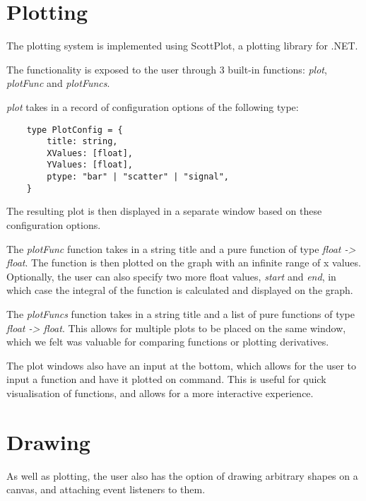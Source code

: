 \section{Plotting}\label{sec:plotting}

The plotting system is implemented using ScottPlot\citep{scottPlot}, a plotting library for .NET\@.

The functionality is exposed to the user through 3 built-in functions: \textit{plot}, \textit{plotFunc} and 
\textit{plotFuncs}.

\textit{plot} takes in a record of configuration options of the following type:

\begin{verbatim}
    type PlotConfig = {
        title: string,
        XValues: [float],
        YValues: [float],
        ptype: "bar" | "scatter" | "signal",
    }
\end{verbatim}

The resulting plot is then displayed in a separate window based on these configuration options.


The \textit{plotFunc} function takes in a string title and a pure function of type \textit{float -> float}.
The function is then plotted on the graph with an infinite range of x values.
Optionally, the user can also specify two more float values, \textit{start} and \textit{end}, in which case the 
integral of the function is calculated and displayed on the graph.


The \textit{plotFuncs} function takes in a string title and a list of pure functions of type \textit{float -> float}.
This allows for multiple plots to be placed on the same window, which we felt was valuable for comparing functions 
or plotting derivatives.

The plot windows also have an input at the bottom, which allows for the user to input a function and have it plotted
on command.
This is useful for quick visualisation of functions, and allows for a more interactive experience.

\section{Drawing}\label{sec:drawing}

As well as plotting, the user also has the option of drawing arbitrary shapes on a canvas, and attaching event 
listeners to them.

